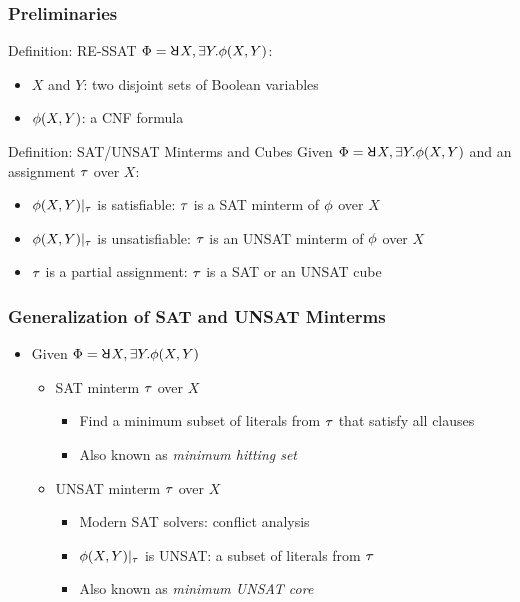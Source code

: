 \begin{frame}
    \frametitle{Preliminaries}
    \begin{block}{Definition: RE-SSAT}
        $\Qf=\random{} X,\exists Y.\pf(X,Y)$:
        \begin{itemize}
            \item $X$ and $Y$: two disjoint sets of Boolean variables
            \item $\phi(X,Y)$: a CNF formula
        \end{itemize}
    \end{block}
    \pause
    \begin{block}{Definition: SAT/UNSAT Minterms and Cubes}
        Given $\Qf=\random{} X,\exists Y.\pf(X,Y)$ and an assignment $\tau$ over $X$:
        \begin{itemize}
            \item $\phi(X,Y)|_{\tau}$ is satisfiable: $\tau$ is a SAT minterm of $\phi$ over $X$
            \item $\phi(X,Y)|_{\tau}$ is unsatisfiable: $\tau$ is an UNSAT minterm of $\phi$ over $X$
            \item $\tau$ is a partial assignment: $\tau$ is a SAT or an UNSAT cube
        \end{itemize}
    \end{block}
\end{frame}

\begin{frame}
    \frametitle{Generalization of SAT and UNSAT Minterms}
    \begin{itemize}
        \item Given $\Qf=\random{} X,\exists Y.\pf(X,Y)$
              \begin{itemize}
                  \item SAT minterm $\tau$ over $X$
                        \begin{itemize}
                            \item Find a minimum subset of literals from $\tau$ that satisfy all clauses
                            \item Also known as \textit{minimum hitting set}
                        \end{itemize}
                  \item UNSAT minterm $\tau$ over $X$
                        \begin{itemize}
                            \item Modern SAT solvers: conflict analysis
                            \item $\phi(X,Y)|_{\tau}$ is UNSAT: a subset of literals from $\tau$
                            \item Also known as \textit{minimum UNSAT core}
                        \end{itemize}
              \end{itemize}
    \end{itemize}
\end{frame}